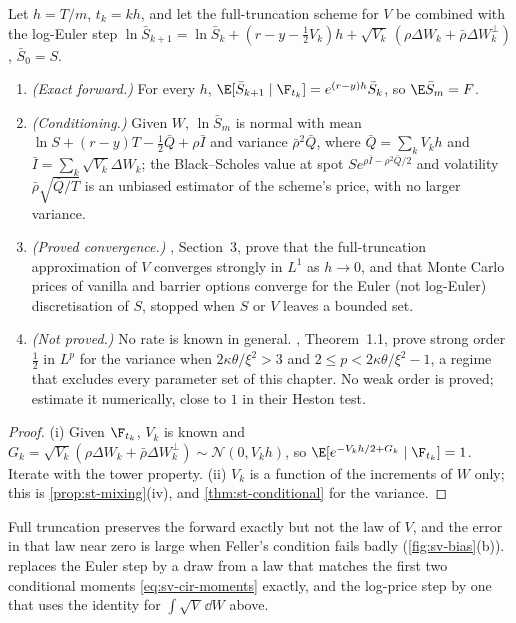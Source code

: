 \begin{proposition}\label{prop:sv-full-truncation}
Let $h=T/m$, $t_k=kh$, and let the full-truncation scheme for $V$ be combined with the log-Euler step
$\ln\bar S_{k+1}=\ln\bar S_k+(r-y-\frac12V_k)h+\sqrt{V_k}\,(\rho\Delta W_k+\bar\rho\Delta W^\perp_k)$, $\bar S_0=S$.
\begin{enumerate}[label=(\roman*)]
  \item \emph{(Exact forward.)} For every $h$, $\E[\bar S_{k+1}\mid\F_{t_k}]=e^{(r-y)h}\bar S_k$, so
    $\E\bar S_m=F$.
  \item \emph{(Conditioning.)} Given $W$, $\ln\bar S_m$ is normal with mean
    $\ln S+(r-y)T-\frac12\bar Q+\rho\bar I$ and variance $\bar\rho^2\bar Q$, where $\bar Q=\sum_kV_kh$ and
    $\bar I=\sum_k\sqrt{V_k}\Delta W_k$; the Black--Scholes value at spot $Se^{\rho\bar I-\rho^2\bar Q/2}$ and
    volatility $\bar\rho\sqrt{\bar Q/T}$ is an unbiased estimator of the scheme's price, with no larger variance.
  \item \emph{(Proved convergence.)} \textcite{lord-koekkoek-vandijk}, Section~3, prove that the
    full-truncation approximation of $V$ converges strongly in $L^1$ as $h\to0$, and that Monte Carlo prices of
    vanilla and barrier options converge for the Euler (not log-Euler) discretisation of $S$, stopped when $S$
    or $V$ leaves a bounded set.
  \item \emph{(Not proved.)} No rate is known in general. \textcite{cozma-reisinger}, Theorem~1.1, prove strong
    order $\frac12$ in $L^p$ for the variance when $2\kappa\theta/\xi^2>3$ and $2\le p<2\kappa\theta/\xi^2-1$, a regime
    that excludes every parameter set of this chapter. No weak order is proved; \textcite{lord-koekkoek-vandijk}
    estimate it numerically, close to $1$ in their Heston test.
\end{enumerate}
\end{proposition}

\begin{proof}
(i) Given $\F_{t_k}$, $V_k$ is known and $G_k=\sqrt{V_k}(\rho\Delta W_k+\bar\rho\Delta W^\perp_k)\sim\mathcal N(0,V_kh)$,
so $\E[e^{-V_kh/2+G_k}\mid\F_{t_k}]=1$. Iterate with the tower property.
(ii) $V_k$ is a function of the increments of $W$ only; this is \cref{prop:st-mixing}(iv), and
\cref{thm:st-conditional} for the variance.
\end{proof}

Full truncation preserves the forward exactly but not the law of $V$, and the error in that law near zero is
large when Feller's condition fails badly (\cref{fig:sv-bias}(b)).
\textcite{andersen-qe} replaces the Euler step by a draw from a law that matches the first two conditional
moments \eqref{eq:sv-cir-moments} exactly, and the log-price step by one that uses the identity for
$\int\sqrt V\,\dd W$ above.

